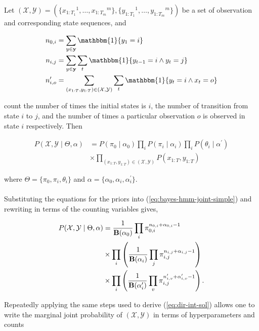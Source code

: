\documentclass[12pt]{report}
\newcommand{\p}[0]{\prime}
\newcommand{\1}[0]{\mathbbm{1}}
\newcommand{\Bf}[0]{\text{\textbf{B}}}
\newcommand{\seq}[3]{\ensuremath{#1_{{#2}:{#3}}}}
\begin{document}
Let $(\mathcal{X}, \mathcal{Y}) = (\{\seq{x}{1}{T_1}^1, \ldots, \seq{x}{1}{T_m}^m\},
\{\seq{y}{1}{T_1}^1, \ldots, \seq{y}{1}{T_m}^m\})$ be a set of
observation and corresponding state sequences, and

\begin{align*}
    n_{0, i} &= \sum_{y \in \mathbf{y}} \1\{y_1 = i\} \\
    n_{i, j} &= \sum_{y \in \mathbf{y}} \sum_{t} \1\{y_{t-1} = i \wedge y_t = j\} \\
    n_{i, o}^\p &= \sum_{(\seq{x}{1}{T},\seq{y}{1}{T}) \in (\mathcal{X},\mathcal{Y})} \sum_{t} \1\{y_t = i \wedge x_t = o\} \\
\end{align*}

count the number of times the initial states is $i$, the number of transition from state $i$ to $j$,
and the number of times a particular observation $o$ is observed in state $i$ respectively. Then

\begin{align}  \label{eq:bayes-hmm-joint-simple}
 P(\mathcal{X}, \mathcal{Y} \mid \Theta, \alpha)
 &=  P(\pi_0 \mid \alpha_0) \prod_i P(\pi_i \mid \alpha_i) \prod_i P(\theta_i \mid \alpha^\prime) \nonumber\\
 & \times \prod_{(\seq{x}{1}{T},\seq{y}{1}{T}) \in (\mathcal{X},\mathcal{Y})} P(\seq{x}{1}{T},\seq{y}{1}{T})
\end{align}

where $\Theta = \{\pi_0, \pi_i, \theta_i\}$ and $\alpha = \{\alpha_0, \alpha_i, \alpha_i^\prime\}$.
\\\\
Substituting the equations for the priors into (\ref{eq:bayes-hmm-joint-simple})
and rewriting in terms of the counting variables gives,

\begin{align} \label{eq:bayes-hmm-joint-full}
    P(\mathcal{X}, \mathcal{Y} \mid \Theta, \alpha)
    &= \frac{1}{\Bf(\alpha_0)} \prod_{i} \pi_{0,i}^{n_{0,i} + \alpha_{0,i} - 1} \nonumber \\
    & \times \prod_i \left(\frac{1}{\Bf(\alpha_i)} \prod_{j} \pi_{i,j}^{n_{i,j} + \alpha_{i,j} - 1}\right) \nonumber \\
    & \times \prod_i \left(\frac{1}{\Bf(\alpha_i^\prime)} \prod_{v} \pi_{i,j}^{n_{i,v}^\prime + \alpha_{i,v}^\prime - 1}\right).
\end{align}

Repeatedly applying the same steps used to derive (\ref{eq:dir-int-sol})
allows one to write the marginal joint probability of $(\mathcal{X}, \mathcal{Y})$
in terms of hyperparameters and counts
\end{document}
